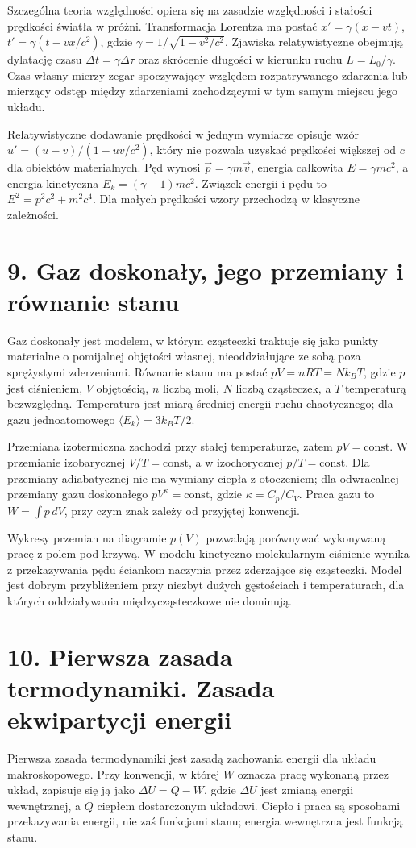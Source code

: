 \documentclass[11pt,a4paper,oneside]{report}
\begin{document}
Szczególna teoria względności opiera się na zasadzie względności i stałości prędkości światła w próżni. Transformacja Lorentza ma postać \(x'=\gamma(x-vt)\), \(t'=\gamma(t-vx/c^2)\), gdzie \(\gamma=1/\sqrt{1-v^2/c^2}\). Zjawiska relatywistyczne obejmują dylatację czasu \(\Delta t=\gamma\Delta\tau\) oraz skrócenie długości w kierunku ruchu \(L=L_0/\gamma\). Czas własny mierzy zegar spoczywający względem rozpatrywanego zdarzenia lub mierzący odstęp między zdarzeniami zachodzącymi w tym samym miejscu jego układu.

Relatywistyczne dodawanie prędkości w jednym wymiarze opisuje wzór \(u'=(u-v)/(1-uv/c^2)\), który nie pozwala uzyskać prędkości większej od \(c\) dla obiektów materialnych. Pęd wynosi \(\vec p=\gamma m\vec v\), energia całkowita \(E=\gamma mc^2\), a energia kinetyczna \(E_k=(\gamma-1)mc^2\). Związek energii i pędu to \(E^2=p^2c^2+m^2c^4\). Dla małych prędkości wzory przechodzą w klasyczne zależności.

\section{9. Gaz doskonały, jego przemiany i równanie stanu}
Gaz doskonały jest modelem, w którym cząsteczki traktuje się jako punkty materialne o pomijalnej objętości własnej, nieoddziałujące ze sobą poza sprężystymi zderzeniami. Równanie stanu ma postać \(pV=nRT=Nk_BT\), gdzie \(p\) jest ciśnieniem, \(V\) objętością, \(n\) liczbą moli, \(N\) liczbą cząsteczek, a \(T\) temperaturą bezwzględną. Temperatura jest miarą średniej energii ruchu chaotycznego; dla gazu jednoatomowego \(\langle E_k\rangle=3k_BT/2\).

Przemiana izotermiczna zachodzi przy stałej temperaturze, zatem \(pV=\mathrm{const}\). W przemianie izobarycznej \(V/T=\mathrm{const}\), a w izochorycznej \(p/T=\mathrm{const}\). Dla przemiany adiabatycznej nie ma wymiany ciepła z otoczeniem; dla odwracalnej przemiany gazu doskonałego \(pV^\kappa=\mathrm{const}\), gdzie \(\kappa=C_p/C_V\). Praca gazu to \(W=\int p\,dV\), przy czym znak zależy od przyjętej konwencji.

Wykresy przemian na diagramie \(p(V)\) pozwalają porównywać wykonywaną pracę z polem pod krzywą. W modelu kinetyczno-molekularnym ciśnienie wynika z przekazywania pędu ściankom naczynia przez zderzające się cząsteczki. Model jest dobrym przybliżeniem przy niezbyt dużych gęstościach i temperaturach, dla których oddziaływania międzycząsteczkowe nie dominują.

\section{10. Pierwsza zasada termodynamiki. Zasada ekwipartycji energii}
Pierwsza zasada termodynamiki jest zasadą zachowania energii dla układu makroskopowego. Przy konwencji, w której \(W\) oznacza pracę wykonaną przez układ, zapisuje się ją jako \(\Delta U=Q-W\), gdzie \(\Delta U\) jest zmianą energii wewnętrznej, a \(Q\) ciepłem dostarczonym układowi. Ciepło i praca są sposobami przekazywania energii, nie zaś funkcjami stanu; energia wewnętrzna jest funkcją stanu.
\end{document}
